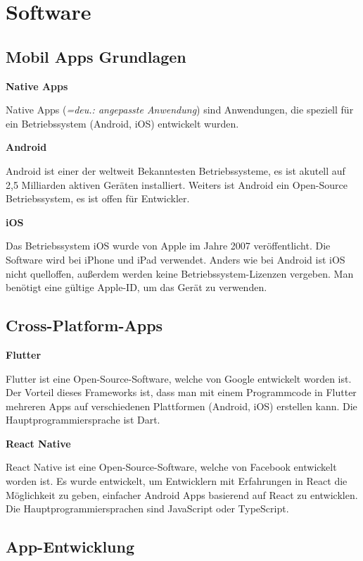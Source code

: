 \section{Software}


\subsection{Mobil Apps Grundlagen}

\textbf{Native Apps}

Native Apps (\emph{=deu.: angepasste Anwendung}) sind Anwendungen, die speziell für ein Betriebssystem (Android, iOS) entwickelt wurden. \textcite{NativeApps}

\textbf{Android}

Android ist einer der weltweit Bekanntesten Betriebssysteme, es ist akutell auf 2,5 Milliarden aktiven Geräten installiert. \textcite{Android} Weiters ist Android ein Open-Source Betriebssystem, es ist offen für Entwickler.  

\textbf{iOS}

Das Betriebssystem iOS wurde von Apple im Jahre 2007 veröffentlicht. \textcite{iOS} Die Software wird bei iPhone und iPad verwendet. Anders wie bei Android ist iOS nicht quelloffen, außerdem werden keine Betriebssystem-Lizenzen vergeben. Man benötigt eine gültige Apple-ID, um das Gerät zu verwenden.

\subsection{Cross-Platform-Apps}

\textbf{Flutter}

Flutter ist eine Open-Source-Software, welche von Google entwickelt worden ist.\textcite{Flutter} Der Vorteil dieses Frameworks ist, dass man mit einem Programmcode in Flutter mehreren Apps auf verschiedenen Plattformen (Android, iOS) erstellen kann. Die Hauptprogrammiersprache ist Dart.

\textbf{React Native}

React Native ist eine Open-Source-Software, welche von Facebook entwickelt worden ist. \textcite{ReactNative} Es wurde entwickelt, um Entwicklern mit Erfahrungen in React die Möglichkeit zu geben, einfacher Android Apps basierend auf React zu entwicklen. Die Hauptprogrammiersprachen sind JavaScript oder TypeScript.

\subsection{App-Entwicklung}


